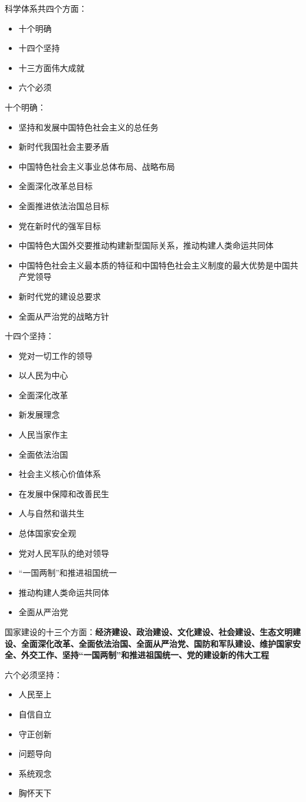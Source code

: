 科学体系共四个方面：
\begin{itemize}
    \item 十个明确
    \item 十四个坚持
    \item 十三方面伟大成就
    \item 六个必须
    
\end{itemize}

十个明确：
\begin{itemize}
    \item 坚持和发展中国特色社会主义的总任务
    \item 新时代我国社会主要矛盾
    \item 中国特色社会主义事业总体布局、战略布局
    \item 全面深化改革总目标
    \item 全面推进依法治国总目标
    \item 党在新时代的强军目标
    \item 中国特色大国外交要推动构建新型国际关系，推动构建人类命运共同体
    \item 中国特色社会主义最本质的特征和中国特色社会主义制度的最大优势是中国共产党领导
    \item 新时代党的建设总要求
    \item 全面从严治党的战略方针
    
\end{itemize}

十四个坚持：
\begin{itemize}
    \item 党对一切工作的领导
    \item 以人民为中心
    \item 全面深化改革
    \item 新发展理念
    \item 人民当家作主
    \item 全面依法治国
    \item 社会主义核心价值体系
    \item 在发展中保障和改善民生
    \item 人与自然和谐共生
    \item 总体国家安全观
    \item 党对人民军队的绝对领导
    \item “一国两制”和推进祖国统一
    \item 推动构建人类命运共同体
    \item 全面从严治党
    
\end{itemize}

国家建设的十三个方面：\textbf{经济建设、政治建设、文化建设、社会建设、生态文明建设、全面深化改革、全面依法治国、全面从严治党、国防和军队建设、维护国家安全、外交工作、坚持“一国两制”和推进祖国统一、党的建设新的伟大工程}

六个必须坚持：
\begin{itemize}
    \item 人民至上
    \item 自信自立
    \item 守正创新
    \item 问题导向
    \item 系统观念
    \item 胸怀天下
\end{itemize}

